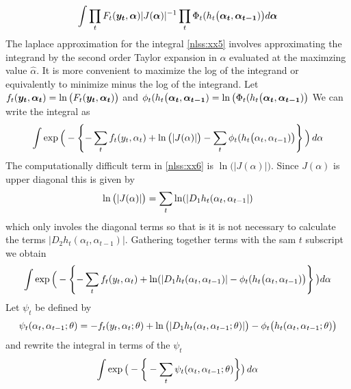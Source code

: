 \begin{equation}
 {
    \int \prod_t F_t(\boldsymbol{y_t},\boldsymbol{\alpha})
    |J(\boldsymbol{\alpha})|^{-1}\prod_t \Phi_t(h_t\big(\boldsymbol{\alpha_t},\boldsymbol{\alpha_{t-1}})\big) d\boldsymbol{\alpha}}\label{nlss:xx5}
\end{equation}
  The laplace approximation for the integral \ref{nlss:xx5}
  involves approximating the integrand by the second order Taylor expansion 
  in $\alpha$ evaluated at the maximzing value $\widehat \alpha$.
    It is more convenient to maximize the log of the integrand or
   equivalently to minimize minus the log of the integrand.
    Let $f_t(\boldsymbol{y_t},\boldsymbol{\alpha_t})=\ln\big(F_t(\boldsymbol{y_t},\boldsymbol{\alpha_t})\big)$
    and $\phi_t(h_t\big(\boldsymbol{\alpha_t},\boldsymbol{\alpha_{t-1}})=
            \ln\big(\Phi_t(h_t\big(\boldsymbol{\alpha_t},\boldsymbol{\alpha_{t-1}})\big)$
We can write the integral as
\begin{equation}
 {
    \int \exp\Big( -\left\{-\sum_t f_t(y_t,\alpha_t)
    +\ln\big(|J(\alpha)|\big)
     -\sum_t \phi_t(h_t\big(\alpha_t,\alpha_{t-1})\big) \right\}\Big)
    \,d\alpha}
    \label{nlss:xx6}
\end{equation}
The computationally difficult term in \ref{nlss:xx6} is 
    $\ln\big(|J(\alpha)|\big)$.
Since $J(\alpha)$ is upper diagonal this is given by 
\begin{equation}
 {
    \ln\big(|J(\alpha)|\big)=\sum_t \ln(|D_1h_t(\alpha_t,\alpha_{t-1}|)}
    \label{nlss:xx7}
\end{equation}
which only involes the diagonal terms so that is it is not necessary to 
calculate the terms $|D_2h_t(\alpha_t,\alpha_{t-1})|$.
Gathering together terms with the sam $t$ subscript we obtain
\begin{equation}
 {
    \int \exp\Big( -\left\{-\sum_t f_t(y_t,\alpha_t)
     +\ln(|D_1h_t(\alpha_t,\alpha_{t-1})|
     -\phi_t(h_t\big(\alpha_t,\alpha_{t-1})\big) \right\}\big)d\alpha}
    \label{nlss:xx8}
\end{equation}
Let $\psi_t$ be defined by
\begin{equation}
 {
   \psi_t(\alpha_t,\alpha_{t-1};\theta)=-f_t(y_t,\alpha_t;\theta)
     +\ln\big (|D_1h_t(\alpha_t,\alpha_{t-1};\theta)|\big)
     -\phi_t\big (h_t(\alpha_t,\alpha_{t-1};\theta)\big)}
    \label{nlss:xx9}
\end{equation}
and rewrite the integral in terms of the $\psi_t$
\begin{equation}
 {
    \int 
      \exp\big( -\bigg\{-\sum_t \psi_t(\alpha_t,\alpha_{t-1};\theta)\bigg\}\big)
    \,d\alpha}
    \label{nlss:xx10}
\end{equation}
